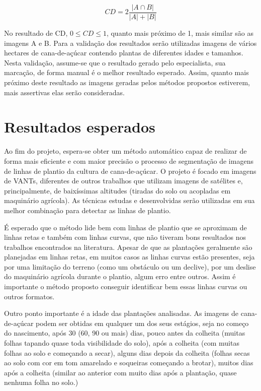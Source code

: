 \documentclass[12pt, a4paper, english, brazil]{article}
\begin{document}
\begin{equation}
    CD = 2 \frac{|A \cap B|}{|A| + |B|}
\end{equation}

No resultado de CD, $0 \le CD \le 1$, quanto mais próximo de 1, mais similar são as imagens A e B. Para a validação dos resultados serão utilizadas imagens de vários hectares de cana-de-açúcar contendo plantas de diferentes idades e tamanhos. Nesta validação, assume-se que o resultado gerado pelo especialista, sua marcação, de forma manual é o melhor resultado esperado. Assim, quanto mais próximo deste resultado as imagens geradas pelos métodos propostos estiverem, mais assertivas elas serão consideradas.

\section{Resultados esperados}

Ao fim do projeto, espera-se obter um método automático capaz de realizar de forma mais eficiente e com maior precisão o processo de segmentação de imagens de linhas de plantio da cultura de cana-de-açúcar. O projeto é focado em imagens de VANTs, diferentes de outros trabalhos que utilizam imagens de satélites e, principalmente, de baixíssimas altitudes (tiradas do solo ou acopladas em maquinário agrícola). As técnicas estudas e desenvolvidas serão utilizadas em sua melhor combinação para detectar as linhas de plantio.

É esperado que o método lide bem com linhas de plantio que se aproximam de linhas retas e também com linhas curvas, que não tiveram bons resultados nos trabalhos encontrados na literatura. Apesar de que as plantações geralmente são planejadas em linhas retas, em muitos casos as linhas curvas estão presentes, seja por uma limitação do terreno (como um obstáculo ou um declive), por um deslise do maquinário agrícola durante o plantio, algum erro entre outros. Assim é importante o método proposto conseguir identificar bem essas linhas curvas ou outros formatos.

Outro ponto importante é a idade das plantações analisadas. As imagens de cana-de-açúcar podem ser obtidas em qualquer um dos seus estágios, seja no começo do nascimento, após 30 (60, 90 ou mais) dias, pouco antes da colheita (muitas folhas tapando quase toda visibilidade do solo), após a colheita (com muitas folhas ao solo e começando a secar), alguns dias depois da colheita (folhas secas ao solo com cor em tom amarelado e soqueiras começando a brotar), muitos dias após a colheita (similar ao anterior com muito dias após a plantação, quase nenhuma folha no solo.) 
\end{document}
